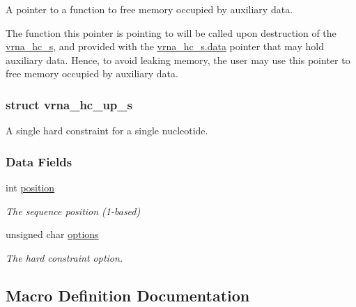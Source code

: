 A pointer to a function to free memory occupied by auxiliary data. 

The function this pointer is pointing to will be called upon destruction of the \mbox{\hyperlink{group__hard__constraints_structvrna__hc__s}{vrna\+\_\+hc\+\_\+s}}, and provided with the \mbox{\hyperlink{group__hard__constraints_acef3d722142cb5f4a8e114e5fbce3b1a}{vrna\+\_\+hc\+\_\+s.\+data}} pointer that may hold auxiliary data. Hence, to avoid leaking memory, the user may use this pointer to free memory occupied by auxiliary data. \label{structvrna__hc__up__s}
\subsubsection{struct vrna\+\_\+hc\+\_\+up\+\_\+s}
A single hard constraint for a single nucleotide. \subsubsection*{Data Fields}
\begin{DoxyCompactItemize}
\item 
\mbox{\label{group__hard__constraints_a67a98def263c534a8c57298098da16e8}} 
int \mbox{\hyperlink{group__hard__constraints_a67a98def263c534a8c57298098da16e8}{position}}
\begin{DoxyCompactList}\small\item\em The sequence position (1-\/based) \end{DoxyCompactList}\item 
\mbox{\label{group__hard__constraints_a468414760f373f7dc0eb1fd47cf708d0}} 
unsigned char \mbox{\hyperlink{group__hard__constraints_a468414760f373f7dc0eb1fd47cf708d0}{options}}
\begin{DoxyCompactList}\small\item\em The hard constraint option. \end{DoxyCompactList}\end{DoxyCompactItemize}


\subsection{Macro Definition Documentation}
\mbox{\label{group__hard__constraints_ga4bfc2f15c4f261c62a11af9d2aa80c90}} 
